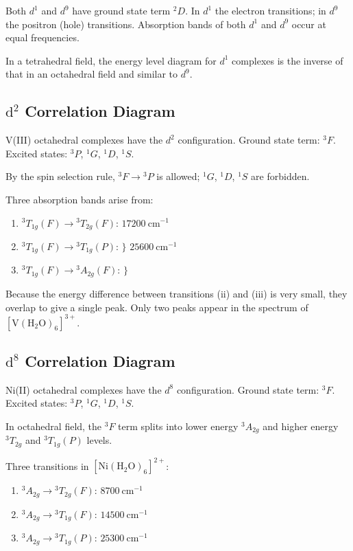 \documentclass[12pt,a4paper]{article}
\begin{document}
Both $d^1$ and $d^9$ have ground state term ${}^2D$. In $d^1$ the electron transitions; in $d^9$ the positron (hole) transitions. Absorption bands of both $d^1$ and $d^9$ occur at equal frequencies.

In a tetrahedral field, the energy level diagram for $d^1$ complexes is the inverse of that in an octahedral field and similar to $d^9$.

\subsection{$\mathrm{d}^2$ Correlation Diagram}

V(III) octahedral complexes have the $d^2$ configuration. Ground state term: ${}^3F$. Excited states: ${}^3P$, ${}^1G$, ${}^1D$, ${}^1S$.

By the spin selection rule, ${}^3F \to {}^3P$ is allowed; ${}^1G$, ${}^1D$, ${}^1S$ are forbidden.

Three absorption bands arise from:
\begin{enumerate}
  \item ${}^3T_{1g}(F) \to {}^3T_{2g}(F)$: $17200\ \mathrm{cm}^{-1}$
  \item ${}^3T_{1g}(F) \to {}^3T_{1g}(P)$: $\}$ $25600\ \mathrm{cm}^{-1}$
  \item ${}^3T_{1g}(F) \to {}^3A_{2g}(F)$: $\}$
\end{enumerate}

Because the energy difference between transitions (ii) and (iii) is very small, they overlap to give a single peak. Only two peaks appear in the spectrum of $[\mathrm{V(H_2O)_6}]^{3+}$.

\subsection{$\mathrm{d}^8$ Correlation Diagram}

Ni(II) octahedral complexes have the $d^8$ configuration. Ground state term: ${}^3F$. Excited states: ${}^3P$, ${}^1G$, ${}^1D$, ${}^1S$.

In octahedral field, the ${}^3F$ term splits into lower energy ${}^3A_{2g}$ and higher energy ${}^3T_{2g}$ and ${}^3T_{1g}(P)$ levels.

Three transitions in $[\mathrm{Ni(H_2O)_6}]^{2+}$:
\begin{enumerate}
  \item ${}^3A_{2g} \to {}^3T_{2g}(F)$: $8700\ \mathrm{cm}^{-1}$
  \item ${}^3A_{2g} \to {}^3T_{1g}(F)$: $14500\ \mathrm{cm}^{-1}$
  \item ${}^3A_{2g} \to {}^3T_{1g}(P)$: $25300\ \mathrm{cm}^{-1}$
\end{enumerate}
\end{document}
